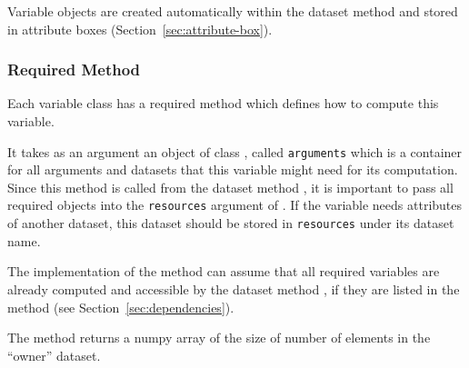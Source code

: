 {Variable \variablesindex objects are created automatically within the dataset \datasetindex method
 \variablesindex and stored in attribute \attributesindex boxes
(Section~\ref{sec:attribute-box}).

\subsubsection{Required Method }
\variablesindex{}
%
Each variable \variablesindex class has a required method  which defines how
to compute this variable. \variablesindex

It takes as an argument an object of class , called
\verb|arguments| which is a container for all arguments and datasets \datasetindex that this
variable \variablesindex might need for its computation. Since this method is called from the
dataset \datasetindex method , \variablesindex it is important to pass all
required objects into the \verb|resources| argument of
. \variablesindex If the variable \variablesindex needs attributes \variablesindex of another
dataset, \datasetindex this dataset \datasetindex should be stored in \verb|resources| under its dataset \datasetindex
name.

The implementation of the  method can assume that all
required variables \variablesindex are already computed and accessible by the dataset \datasetindex
method , \attributesindex if they are listed in the
 method (see Section~\ref{sec:dependencies}).

The  method returns a numpy array \numpyindex of the size of number
of elements in the ``owner'' dataset. \datasetindex

}
